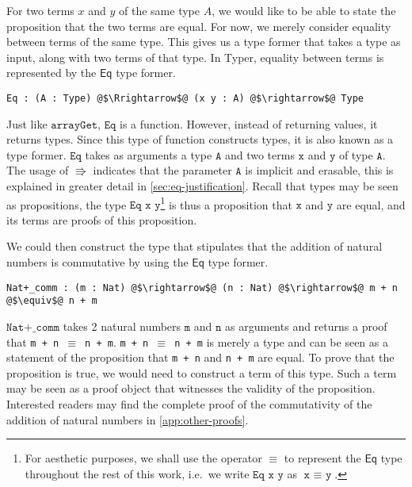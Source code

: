 \documentclass[12pt,twoside,maitrise]{dms}
\theoremstyle{definition}
\numberwithin{equation}{section}
\numberwithin{table}{chapter}
\numberwithin{figure}{chapter}
\newcommand\kw[1] {\textsf{#1}}
\newcommand\id[1] {\texttt{#1}}
\newcommand\fn[1] {\texttt{#1}}
\begin{document}

For two terms $x$ and $y$ of the same type $A$, we would like to be able to
state the proposition that the two terms are equal. For now, we merely consider
equality between terms of the same type. This gives us a type former that takes
a type as input, along with two terms of that type. In Typer, equality between
terms is represented by the $\kw{Eq}$ type former.

\begin{verbatim}
Eq : (A : Type) @$\Rrightarrow$@ (x y : A) @$\rightarrow$@ Type
\end{verbatim}

Just like $\id{arrayGet}$, $\id{Eq}$ is a function. However, instead of
returning values, it returns types. Since this type of function constructs
types, it is also known as a type former. $\id{Eq}$ takes as arguments a type
$\id{A}$ and two terms $\id{x}$ and $\id{y}$ of type $\id{A}$. The usage of
$\Rrightarrow$ indicates that the parameter $\id{A}$ is implicit and erasable,
this is explained in greater detail in \autoref{sec:eq-justification}. Recall
that types may be seen as propositions, the type $\fn{Eq x y}$\footnote{For
aesthetic purposes, we shall use the operator $\equiv$ to represent the
$\kw{Eq}$ type throughout the rest of this work, i.e.\ we write $\fn{Eq x y}$ as
$\fn{x $\equiv$ y}$.} is thus a proposition that $\fn{x}$ and $\fn{y}$ are
equal, and its terms are proofs of this proposition.

We could then construct the type that stipulates that the addition of natural
numbers is commutative by using the $\kw{Eq}$ type former.

\begin{verbatim}
Nat+_comm : (m : Nat) @$\rightarrow$@ (n : Nat) @$\rightarrow$@ m + n @$\equiv$@ n + m
\end{verbatim}

$\fn{Nat+\_comm}$ takes 2 natural numbers $\fn{m}$ and $\fn{n}$ as arguments and
returns a proof that \fn{m + n $\equiv$ n + m}. \fn{m + n $\equiv$ n + m} is
merely a type and can be seen as a statement of the proposition that \fn{m + n}
and \fn{n + m} are equal. To prove that the proposition is 
true, we would need to construct a term of this type. Such a term may be seen as
a proof object that witnesses the validity of the proposition. Interested
readers may find the complete proof of the commutativity of the addition of natural
numbers in \autoref{app:other-proofs}.
\end{document}
